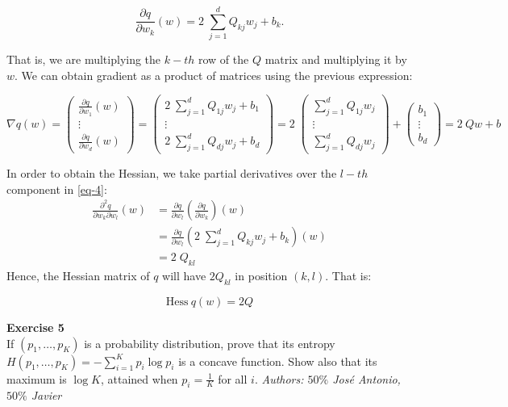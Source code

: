 \documentclass[11pt,table]{article}
\newenvironment{problem}[2][Exercise]
{ \begin{mdframed}[backgroundcolor=gray!20] \textbf{#1 #2} \\}
	{\hspace{0.0cm}\newline\newline \emph{Authors: \(50\%\) José Antonio, \(50\%\) Javier}  \end{mdframed}}
\begin{document}
\begin{equation}
	\label{eq-4}
	\frac{\partial q}{\partial w_k} (w) = 2 \; \sum_{j=1}^{d} Q_{kj} w_{j} + b_{k}.
\end{equation}

That is, we are multiplying the \(k-th\) row of the \(Q\) matrix and multiplying it by \(w\). We can obtain gradient as a product of matrices using the previous expression:

\[
	\nabla q(w) = \begin{pmatrix}
		\frac{\partial q}{\partial w_1} (w) \\
		\vdots                              \\
		\frac{\partial q}{\partial w_d} (w)
	\end{pmatrix}
	= \begin{pmatrix}
		2 \; \sum_{j=1}^{d} Q_{1j} w_{j} + b_{1} \\
		\vdots                                   \\
		2 \; \sum_{j=1}^{d} Q_{dj} w_{j} + b_{d}
	\end{pmatrix}
	= 2 \; \begin{pmatrix}
		\sum_{j=1}^{d} Q_{1j} w_{j} \\
		\vdots                      \\
		\sum_{j=1}^{d} Q_{dj} w_{j}
	\end{pmatrix} + \begin{pmatrix}
		b_{1}  \\
		\vdots \\
		b_{d}
	\end{pmatrix}
	= 2 \ Qw + b
\]

In order to obtain the Hessian, we take partial derivatives over the \(l-th\) component in \ref{eq-4}:
\begin{align*}
	\frac{\partial^2 q}{\partial w_k \partial w_l} (w) & = \frac{\partial q}{\partial w_l} \left( \frac{\partial q}{\partial w_k} \right) (w)          \\
	                                                   & = \frac{\partial q}{\partial w_l} \left( 2 \; \sum_{j=1}^{d} Q_{kj} w_{j} + b_{k} \right) (w) \\
	                                                   & = 2 \; Q_{kl}
\end{align*}
Hence, the Hessian matrix of \(q\) will have \(2 Q_{kl}\) in position \((k, l)\). That is:

\[
	\text{Hess} \ q(w) = 2Q
\]

\begin{problem}{5}
If \( (p_1,\dots,p_K) \) is a probability distribution, prove that its entropy \( H(p_1, \dots, p_K) = - \sum_{i=1}^K p_i \log p_i\) is a concave function. Show also that its maximum is \( \log K \), attained when \( p_i = \frac{1}{K}\) for all $i$.
\end{problem}
\end{document}
